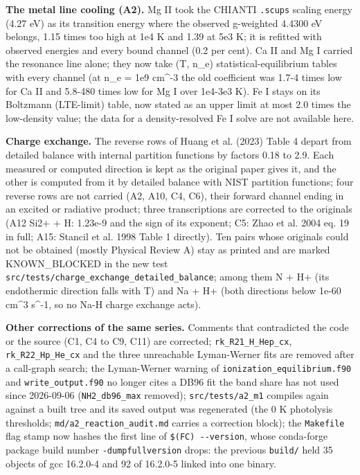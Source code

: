 \documentclass[english,a4paper]{my_memo}
\begin{document}
\textbf{The metal line cooling (A2).} Mg II took the CHIANTI \texttt{.scups} scaling
energy (4.27 eV) as its transition energy where the observed g-weighted
4.4300 eV belongs, 1.15 times too high at 1e4 K and 1.39 at 5e3 K; it is
refitted with observed energies and every bound channel (0.2 per cent).
Ca II and Mg I carried the resonance line alone; they now take (T, n\_e)
statistical-equilibrium tables with every channel (at n\_e = 1e9 cm\^{}-3 the
old coefficient was 1.7-4 times low for Ca II and 5.8-480 times low for Mg I
over 1e4-3e3 K). Fe I stays on its Boltzmann (LTE-limit) table, now stated
as an upper limit at most 2.0 times the low-density value; the data for a
density-resolved Fe I solve are not available here.

\textbf{Charge exchange.} The reverse rows of Huang et al. (2023) Table 4 depart
from detailed balance with internal partition functions by factors 0.18 to
2.9. Each measured or computed direction is kept as the original paper gives
it, and the other is computed from it by detailed balance with NIST
partition functions; four reverse rows are not carried (A2, A10, C4, C6),
their forward channel ending in an excited or radiative product; three
transcriptions are corrected to the originals (A12 Si2+ + H: 1.23e-9 and
the sign of its exponent; C5: Zhao et al. 2004 eq. 19 in full; A15: Stancil
et al. 1998 Table 1 directly). Ten pairs whose originals could not be
obtained (mostly Physical Review A) stay as printed and are marked
KNOWN\_BLOCKED in the new test \texttt{src/tests/charge\_exchange\_detailed\_balance};
among them N + H+ (its endothermic direction falls with T) and Na + H+ (both
directions below 1e-60 cm\^{}3 s\^{}-1, so no Na-H charge exchange acts).

\textbf{Other corrections of the same series.} Comments that contradicted the
code or the source (C1, C4 to C9, C11) are corrected; \texttt{rk\_R21\_H\_Hep\_cx},
\texttt{rk\_R22\_Hp\_He\_cx} and the three unreachable Lyman-Werner fits are removed
after a call-graph search; the Lyman-Werner warning of
\texttt{ionization\_equilibrium.f90} and \texttt{write\_output.f90} no longer cites a DB96
fit the band share has not used since 2026-09-06 (\texttt{NH2\_db96\_max} removed);
\texttt{src/tests/a2\_m1} compiles again against a built tree and its saved output
was regenerated (the 0 K photolysis thresholds; \texttt{md/a2\_reaction\_audit.md}
carries a correction block); the \texttt{Makefile} flag stamp now hashes the first
line of \texttt{\$(FC)\ -\/-version}, whose conda-forge package build number
\texttt{-dumpfullversion} drops: the previous \texttt{build/} held 35 objects of gcc
16.2.0-4 and 92 of 16.2.0-5 linked into one binary.
\end{document}
